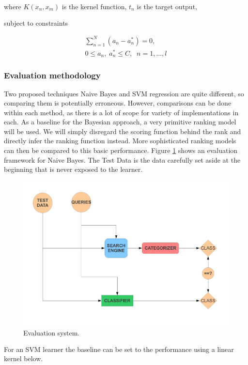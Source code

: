 \documentclass[12pt,twoside,notitlepage]{report}
\begin{document}
where \(K(x_n,x_m) \) is the kernel function, \(t_n\) is the target output,

subject to constraints

\begin{gather}
  \sum_{n=1}^{N}(a_n-a_n^*)=0,\\
  0\leq a_n,\; a_n^*\leq C,\;\;    n=1,...,l 
\end{gather}


\subsubsection*{Evaluation methodology}
Two proposed techniques Naive Bayes and SVM regression are quite different, so
comparing them is potentially erroneous. However, comparisons can be done
within each method, as there is a lot of scope for variety of implementations
in each.
As a baseline for the Bayesian approach, a very primitive ranking model will be
used. We will simply disregard the scoring function behind the rank and
directly infer the ranking function instead. More sophisticated ranking models
can then be compared to this basic performance.
Figure \ref{eval} shows an evaluation framework for Naive Bayes.  The Test Data
is the data carefully set aside at the beginning that is never exposed to the
learner. 

\begin{figure}[h]
\centering
\includegraphics[scale=0.5]{figs/eval.pdf}
\caption{Evaluation system. }
\label{eval}
\end{figure}
For an SVM learner the baseline can be set to the performance using a linear
kernel below.
\end{document}
